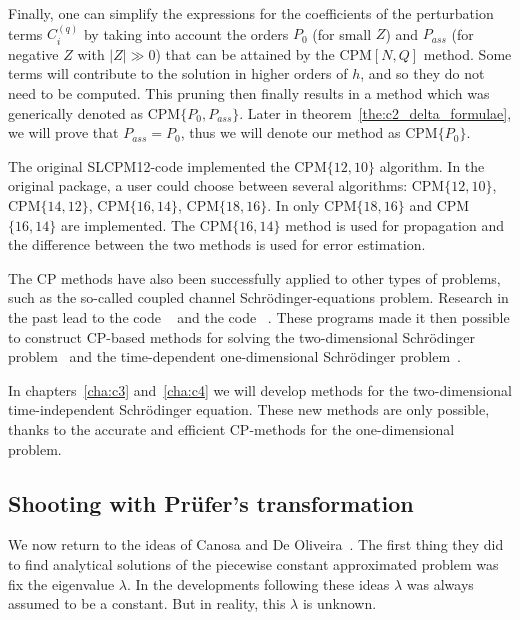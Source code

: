 Finally, one can simplify the expressions for the coefficients of the perturbation terms $C^{(q)}_i$ by taking into account the orders $P_0$ (for small $Z$) and $P_{ass}$ (for negative $Z$ with $|Z| \gg 0$) that can be attained by the CPM$[N,Q]$ method. Some terms will contribute to the solution in higher orders of $h$, and so they do not need to be computed. This pruning then finally results in a method which was generically denoted as CPM$\{P_0, P_{ass}\}$. Later in theorem~\ref{the:c2_delta_formulae}, we will prove that $P_{ass} = P_0$, thus we will denote our method as CPM$\{P_0\}$.

The original SLCPM12-code implemented the CPM$\{12,10\}$ algorithm. In the original \matslise{} package, a user could choose between several algorithms: CPM$\{12,10\}$, CPM$\{14,12\}$, CPM$\{16,14\}$, CPM$\{18,16\}$.
In  only CPM$\{18,16\}$ and CPM$\{16,14\}$ are implemented. The CPM$\{16,14\}$ method is used for propagation and the difference between the two methods is used for error estimation.

The CP methods have also been successfully applied to other types of problems, such as the so-called coupled channel Schrödinger-equations problem. Research in the past lead to the \fortran{} code \lilix{}~\cite{ixaru_lilix_2002} and the \matlab{} code \matscs{}~\cite{ledoux_numerical_2007}. These programs made it then possible to construct CP-based methods for solving the two-dimensional Schrödinger problem~\cite{ixaru_new_2010} and the time-dependent one-dimensional Schrödinger problem~\cite{ledoux_accurate_2014}.

In chapters~\ref{cha:c3} and~\ref{cha:c4} we will develop methods for the two-dimensional time-independent Schrödinger equation. These new methods are only possible, thanks to the accurate and efficient CP-methods for the one-dimensional problem.

\subsection{Shooting with Prüfer's transformation}\label{sec:c2_shooting_prufer}

We now return to the ideas of Canosa and De Oliveira~\cite{canosa_new_1970}. The first thing they did to find analytical solutions of the piecewise constant approximated problem was fix the eigenvalue $\lambda$. In the developments following these ideas $\lambda$ was always assumed to be a constant. But in reality, this $\lambda$ is unknown.

